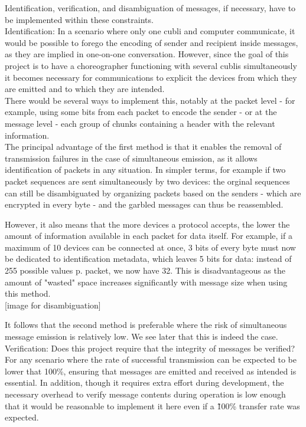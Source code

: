 Identification, verification, and disambiguation of messages, if necessary, have to be implemented within these constraints.\\

Identification: In a scenario where only one cubli and computer communicate, it would be possible to forego the encoding of sender and recipient inside messages, as they are implied in one-on-one conversation. However, since the goal of this project is to have a choreographer functioning with several cublis simultaneously it becomes necessary for communications to explicit the devices from which they are emitted and to which they are intended.\\

There would be several ways to implement this, notably at the packet level - for example, using some bits from each packet to encode the sender - or at the message level - each group of chunks containing a header with the relevant information.\\

The principal advantage of the first method is that it enables the removal of transmission failures in the case of simultaneous emission, as it allows identification of packets in any situation. In simpler terms, for example if two packet sequences are sent simultaneously by two devices: the orginal sequences can still be disambiguated by organizing packets based on the senders - which are encrypted in every byte - and the garbled messages can thus be reassembled.

However, it also means that the more devices a protocol accepts, the lower the amount of information available in each packet for data itself. For example, if a maximum of 10 devices can be connected at once, 3 bits of every byte must now be dedicated to identification metadata, which leaves 5 bits for data: instead of 255 possible values p. packet, we now have 32. This is disadvantageous as the amount of "wasted" space increases significantly with message size when using this method.\\

[image for disambiguation]

It follows that the second method is preferable where the risk of simultaneous message emission is relatively low. We see later that this is indeed the case. \\


Verification: Does this project require that the integrity of messages be verified? For any scenario where the rate of successful transmission can be expected to be lower that 100\%, ensuring that messages are emitted and received as intended is essential. In addition, though it requires extra effort during development, the necessary overhead to verify message contents during operation is low enough that it would be reasonable to implement it here even if a \~100\% transfer rate was expected.




